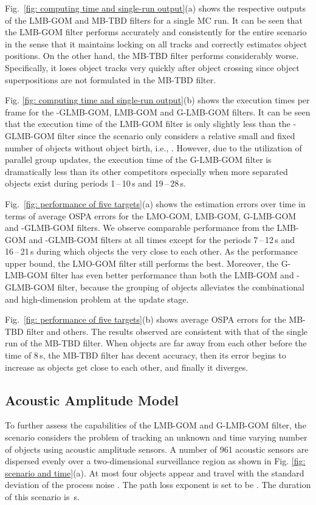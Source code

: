 \documentclass[journal]{IEEEtran}
\begin{document}
{Fig.~\ref{fig: computing time and single-run output}(a) shows the respective outputs of the LMB-GOM  and MB-TBD filters for a single MC run.   It can be seen that the LMB-GOM filter performs accurately and consistently for the entire scenario
in the sense that it maintains locking on all tracks and correctly
estimates object positions.
On the other hand, the MB-TBD filter performs considerably worse.  Specifically,  it loses object tracks very quickly after object crossing since  object superpositions are 
not formulated in the MB-TBD filter.


Fig. \ref{fig: computing time and single-run output}(b) shows the execution times per frame for the -GLMB-GOM, LMB-GOM and G-LMB-GOM filters. It can be seen that the execution  time of the LMB-GOM filter is only slightly less than the -GLMB-GOM filter since the scenario only considers a relative small and fixed number of objects without object birth, i.e., . However, due to the utilization of  parallel group updates, the execution time of the G-LMB-GOM filter is dramatically less than its other competitors especially when more separated objects exist during periods 1\,--\,10\,s and 19\,--\,28\,s.


Fig.~\ref{fig: performance of five targets}(a) shows  the estimation errors over time in terms of average OSPA errors   for the LMO-GOM,  LMB-GOM,  G-LMB-GOM and -GLMB-GOM  filters.  We observe comparable performance from the LMB-GOM and -GLMB-GOM filters at all times except for the periods 7\,--\,12\,s and 16\,--\,21\,s during which objects the very close to each other. As the performance upper bound, the LMO-GOM filter still performs the best. Moreover, the G-LMB-GOM filter  has even better performance than both the LMB-GOM and -GLMB-GOM filter, because the grouping of objects alleviates the combinational and  high-dimension problem at the update stage.

Fig.~\ref{fig: performance of five targets}(b)  shows average OSPA errors for the MB-TBD filter and others. The results observed are consistent  with that of the single run of the MB-TBD filter. When objects are far away from each other before the time of 8\,s, the MB-TBD filter has decent accuracy, then its error begins to increase as objects get close to each other, and finally it diverges.

\subsection{Acoustic Amplitude Model}
To further assess  the capabilities of the LMB-GOM and G-LMB-GOM filter,  the scenario considers the problem of tracking an unknown and time varying number of objects using acoustic amplitude sensors.   
A number of  961 acoustic sensors  are dispersed evenly over a two-dimensional surveillance region   as shown in Fig. \ref{fig: scenario and time}(a).   At most four objects appear and travel with the standard deviation of the process noise .  The path loss exponent is set to be .  The duration of this scenario is  \,s.
 
}
\end{document}
